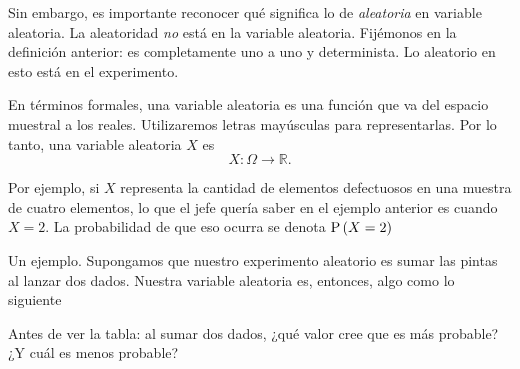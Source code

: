 Sin embargo, es importante reconocer qué significa lo de \emph{aleatoria} en variable aleatoria. La aleatoridad \emph{no} está en la variable aleatoria. Fijémonos en la definición anterior: es completamente uno a uno y determinista. Lo aleatorio en esto está en el experimento. 

\formal
En términos formales, una variable aleatoria es una función que va del espacio muestral a los reales. Utilizaremos letras mayúsculas para representarlas. Por lo tanto, una variable aleatoria \(X\) es \[X: \Omega \to ℝ.\]

Por ejemplo, si \(X\) representa la cantidad de elementos defectuosos en una muestra de cuatro elementos, lo que el jefe quería saber en el ejemplo anterior es cuando \(X=2\). La probabilidad de que eso ocurra se denota \(\operatorname{P}\left(X=2\right)\)

\informal
Un ejemplo. Supongamos que nuestro experimento aleatorio es sumar las pintas al lanzar dos dados. Nuestra variable aleatoria es, entonces, algo como lo siguiente

\begin{pausa}
Antes de ver la tabla: al sumar dos dados, ¿qué valor cree que es más probable? ¿Y cuál es menos probable?
\end{pausa}

